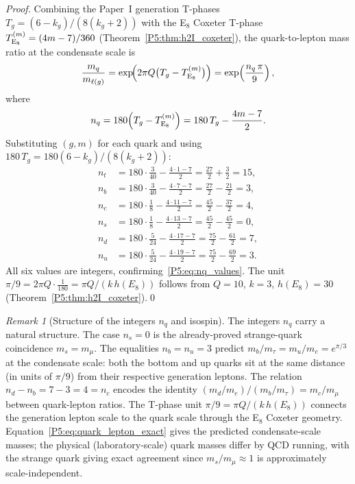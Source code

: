 \documentclass[11pt,a4paper]{article}
\theoremstyle{definition}
\theoremstyle{remark}
\newtheorem{remark}[theorem]{Remark}
\begin{document}
\begin{proof}
Combining the Paper~I generation T-phases~\cite{Paper1}
$T_g = (6-k_g)/(8(k_g+2))$ with the E$_8$ Coxeter T-phase
$T^{(m)}_{\rm E_8} = (4m-7)/360$ (Theorem~\ref{P5:thm:h2I_coxeter}), the
quark-to-lepton mass ratio at the condensate scale is
\begin{equation}
  \frac{m_q}{m_{\ell(g)}} = \exp\!\Bigl(2\pi Q\bigl(T_g - T^{(m)}_{\rm E_8}\bigr)\Bigr)
  = \exp\!\left(\frac{n_q\,\pi}{9}\right),
  \label{P5:eq:ratio_derivation}
\end{equation}
where
\begin{equation}
  n_q = 180\!\left(T_g - T^{(m)}_{\rm E_8}\right)
  = 180\,T_g - \frac{4m-7}{2}.
  \label{P5:eq:nq_formula}
\end{equation}
Substituting $(g, m)$ for each quark and using $180\,T_g = 180(6-k_g)/(8(k_g+2))$:
\begin{align*}
  n_t &= 180\cdot\tfrac{3}{40} - \tfrac{4\cdot1-7}{2}
       = \tfrac{27}{2} + \tfrac{3}{2} = 15,\\
  n_b &= 180\cdot\tfrac{3}{40} - \tfrac{4\cdot7-7}{2}
       = \tfrac{27}{2} - \tfrac{21}{2} = 3,\\
  n_c &= 180\cdot\tfrac{1}{8} - \tfrac{4\cdot11-7}{2}
       = \tfrac{45}{2} - \tfrac{37}{2} = 4,\\
  n_s &= 180\cdot\tfrac{1}{8} - \tfrac{4\cdot13-7}{2}
       = \tfrac{45}{2} - \tfrac{45}{2} = 0,\\
  n_d &= 180\cdot\tfrac{5}{24} - \tfrac{4\cdot17-7}{2}
       = \tfrac{75}{2} - \tfrac{61}{2} = 7,\\
  n_u &= 180\cdot\tfrac{5}{24} - \tfrac{4\cdot19-7}{2}
       = \tfrac{75}{2} - \tfrac{69}{2} = 3.
\end{align*}
All six values are integers, confirming~\eqref{P5:eq:nq_values}.
The unit $\pi/9 = 2\pi Q \cdot \tfrac{1}{180} = \pi Q/(k\,h(E_8))$
follows from $Q = 10$, $k=3$, $h(E_8)=30$ (Theorem~\ref{P5:thm:h2I_coxeter}).\qed
\end{proof}

\begin{remark}[Structure of the integers $n_q$ and isospin]
\label{P5:rem:nq_structure}
The integers $n_q$ carry a natural structure.
The case $n_s = 0$ is the already-proved strange-quark coincidence $m_s = m_\mu$.
The equalities $n_b = n_u = 3$ predict $m_b/m_\tau = m_u/m_e = e^{\pi/3}$
at the condensate scale: both the bottom and up quarks sit at the same distance
(in units of $\pi/9$) from their respective generation leptons.
The relation $n_d - n_b = 7-3 = 4 = n_c$ encodes the identity
$(m_d/m_e)/(m_b/m_\tau) = m_c/m_\mu$ between quark-lepton ratios.
The T-phase unit $\pi/9 = \pi Q/(k\,h(E_8))$ connects the generation
lepton scale to the quark scale through the E$_8$ Coxeter geometry.
Equation~\eqref{P5:eq:quark_lepton_exact} gives the predicted condensate-scale
masses; the physical (laboratory-scale) quark masses differ by QCD running,
with the strange quark giving exact agreement since $m_s/m_\mu \approx 1$
is approximately scale-independent.
\end{remark}
\end{document}
